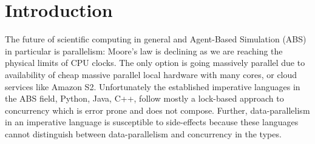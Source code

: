 \section{Introduction} %


The future of scientific computing in general and Agent-Based Simulation (ABS) in particular is parallelism: Moore's law is declining as we are reaching the physical limits of CPU clocks. The only option is going massively parallel due to availability of cheap massive parallel local hardware with many cores, or cloud services like Amazon S2. Unfortunately the established imperative languages in the ABS field, Python, Java, C++, follow mostly a lock-based approach to concurrency which is error prone and does not compose. Further, data-parallelism in an imperative language is susceptible to side-effects because these languages cannot distinguish between data-parallelism and concurrency in the types. 

